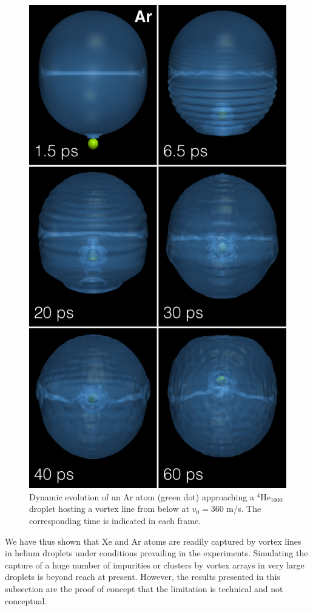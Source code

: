 \begin{figure}[h]
\centerline{\includegraphics[width=0.60\linewidth,clip]{fig11}}
\caption{\label{fig11} 
Dynamic evolution of an Ar atom (green dot) approaching a $^4$He$_{1000}$ 
droplet  hosting a vortex line from below at $v_0 = 360$ m/s. The corresponding time is indicated in each frame.\cite{ESI}  
}
\end{figure}

 

We have thus shown that   Xe and Ar atoms are readily captured by vortex lines in helium droplets under conditions prevailing in the experiments.\cite{Gom14,Jon16} Simulating the 
capture of a huge number of  impurities or clusters by vortex arrays in  very large droplets is beyond reach at present. However, the results presented in
this subsection are the proof of concept that the limitation is technical and not conceptual.

